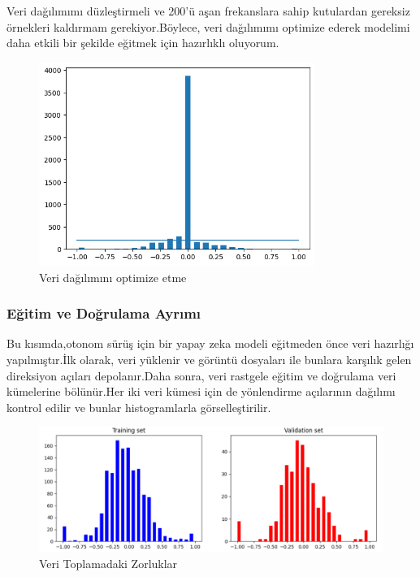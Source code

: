 \documentclass{article}
\begin{document}
\noindent Veri dağılımımı düzleştirmeli ve 200'ü aşan frekanslara sahip kutulardan gereksiz örnekleri kaldırmam gerekiyor.Böylece, veri dağılımımı optimize ederek modelimi daha etkili bir şekilde eğitmek için hazırlıklı oluyorum.

\begin{figure}[h]
  \centering
  \includegraphics[width=0.8\textwidth]{image/grafik.png} %
\caption{Veri dağılımını optimize etme}
  \label{fig:cnnmimari}  
\end{figure}





\subsubsection{Eğitim ve Doğrulama Ayrımı}
Bu kısımda,otonom sürüş için bir yapay zeka modeli eğitmeden önce veri hazırlığı yapılmıştır.İlk olarak, veri yüklenir ve görüntü dosyaları ile bunlara karşılık gelen direksiyon açıları depolanır.Daha sonra, veri rastgele eğitim ve doğrulama veri kümelerine bölünür.Her iki veri kümesi için de yönlendirme açılarının dağılımı kontrol edilir ve bunlar histogramlarla görselleştirilir.

\begin{figure}[h]
  \centering
  \includegraphics[width=1\textwidth]{image/Resim64.PNG} %
\caption{Veri Toplamadaki Zorluklar}
  \label{fig:cnnmimari}  
\end{figure}
\newpage
\end{document}
